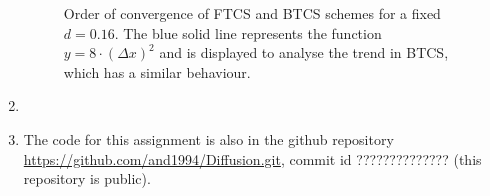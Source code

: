\documentclass[12pt]{article}
\begin{document}
\begin{enumerate}
\begin{figure}[!tbh]
\caption{Order of convergence of FTCS and BTCS schemes for a fixed $d=0.16$. The blue solid line represents the function $y=8\cdot(\Delta x)^2$ and is displayed to analyse the trend in BTCS, which has a similar behaviour.
\label{fig:Q5}}
\end{figure}

\item 
\item The code for this assignment is also in the github repository\\
\url{https://github.com/and1994/Diffusion.git}, commit id ?????????????? (this repository is public).


\end{enumerate}
\end{document}
